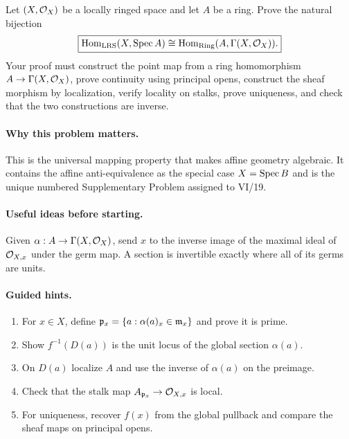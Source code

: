 \begin{problem}\label{prob:vi19-p01}
Let $(X,\mathcal O_X)$ be a locally ringed space and let $A$ be a ring.  Prove the natural bijection
\[
\boxed{\operatorname{Hom}_{\mathrm{LRS}}(X,\operatorname{Spec} A)\cong
\operatorname{Hom}_{\mathrm{Ring}}(A,\Gamma(X,\mathcal O_X)).}
\]
Your proof must construct the point map from a ring homomorphism $A\to\Gamma(X,\mathcal O_X)$, prove continuity using principal opens, construct the sheaf morphism by localization, verify locality on stalks, prove uniqueness, and check that the two constructions are inverse.
\end{problem}

\ifdefined\FullProblemDossiers
\paragraph{Why this problem matters.}
This is the universal mapping property that makes affine geometry algebraic.  It contains the affine anti-equivalence as the special case $X=\operatorname{Spec} B$ and is the unique numbered Supplementary Problem assigned to VI/19.

\paragraph{Useful ideas before starting.}
Given $\alpha:A\to\Gamma(X,\mathcal O_X)$, send $x$ to the inverse image of the maximal ideal of $\mathcal O_{X,x}$ under the germ map.  A section is invertible exactly where all of its germs are units.

\paragraph{Guided hints.}
\begin{enumerate}
\item For $x\in X$, define $\mathfrak p_x=\{a: \alpha(a)_x\in\mathfrak m_x\}$ and prove it is prime.
\item Show $f^{-1}(D(a))$ is the unit locus of the global section $\alpha(a)$.
\item On $D(a)$ localize $A$ and use the inverse of $\alpha(a)$ on the preimage.
\item Check that the stalk map $A_{\mathfrak p_x}\to\mathcal O_{X,x}$ is local.
\item For uniqueness, recover $f(x)$ from the global pullback and compare the sheaf maps on principal opens.
\end{enumerate}


